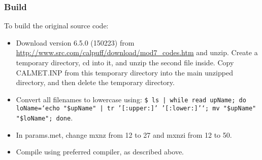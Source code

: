\documentclass[10pt,a4paper]{article}
\begin{document}
\subsubsection{Build}
To build the original source code:
\begin{itemize}
\item Download version 6.5.0 (150223) from \url{http://www.src.com/calpuff/download/mod7_codes.htm} and unzip. Create a temporary directory, cd into it, and unzip the second file inside. Copy CALMET.INP from this temporary directory into the main unzipped directory, and then delete the temporary directory.
\item Convert all filenames to lowercase using: \texttt{\$ ls | while read upName; do loName=`echo "\${upName}" | tr '[:upper:]' '[:lower:]'`; mv "\$upName" "\$loName"; done}.
\item In params.met, change mxnz from 12 to 27 and mxnzi from 12 to 50.
\item Compile using preferred compiler, as described above.
\end{itemize}
\end{document}
